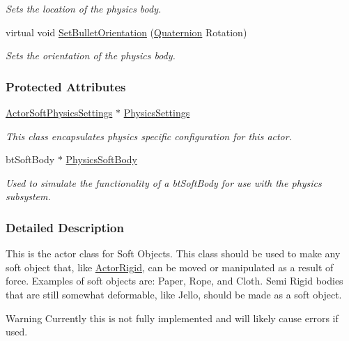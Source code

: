 \begin{DoxyCompactItemize}
\begin{DoxyCompactList}\small\item\em Sets the location of the physics body. \item\end{DoxyCompactList}\item 
virtual void \hyperlink{classMezzanine_1_1ActorSoft_abe282473ccb1f02c273be6efd620d83c}{SetBulletOrientation} (\hyperlink{classMezzanine_1_1Quaternion}{Quaternion} Rotation)
\begin{DoxyCompactList}\small\item\em Sets the orientation of the physics body. \item\end{DoxyCompactList}\end{DoxyCompactItemize}
\subsubsection*{Protected Attributes}
\begin{DoxyCompactItemize}
\item 
\hypertarget{classMezzanine_1_1ActorSoft_ab7ea9b20786fbd7505f836135c890434}{
\hyperlink{classMezzanine_1_1ActorSoftPhysicsSettings}{ActorSoftPhysicsSettings} $\ast$ \hyperlink{classMezzanine_1_1ActorSoft_ab7ea9b20786fbd7505f836135c890434}{PhysicsSettings}}
\label{classMezzanine_1_1ActorSoft_ab7ea9b20786fbd7505f836135c890434}

\begin{DoxyCompactList}\small\item\em This class encapsulates physics specific configuration for this actor. \item\end{DoxyCompactList}\item 
\hypertarget{classMezzanine_1_1ActorSoft_a4eb4bcfe665df0c4741f5c17ff268c88}{
btSoftBody $\ast$ \hyperlink{classMezzanine_1_1ActorSoft_a4eb4bcfe665df0c4741f5c17ff268c88}{PhysicsSoftBody}}
\label{classMezzanine_1_1ActorSoft_a4eb4bcfe665df0c4741f5c17ff268c88}

\begin{DoxyCompactList}\small\item\em Used to simulate the functionality of a btSoftBody for use with the physics subsystem. \item\end{DoxyCompactList}\end{DoxyCompactItemize}


\subsubsection{Detailed Description}
This is the actor class for Soft Objects. This class should be used to make any soft object that, like \hyperlink{classMezzanine_1_1ActorRigid}{ActorRigid}, can be moved or manipulated as a result of force. Examples of soft objects are: Paper, Rope, and Cloth. Semi Rigid bodies that are still somewhat deformable, like Jello, should be made as a soft object. \begin{DoxyWarning}{Warning}
Currently this is not fully implemented and will likely cause errors if used. 
\end{DoxyWarning}


